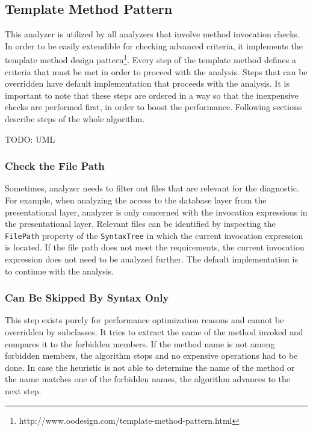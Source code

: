 \documentclass[
  digital, %
  table,   %
  lof,     %
  lot,     %
  oneside,
]{fithesis3}
\begin{document}
\subsection{Template Method Pattern}
This analyzer is utilized by all analyzers that involve method invocation checks. In order to be easily extendible for checking advanced criteria, it implements the template method design pattern\footnote{http://www.oodesign.com/template-method-pattern.html}. Every step of the template method defines a criteria that must be met in order to proceed with the analysis. Steps that can be overridden have default implementation that proceeds with the analysis. It is important to note that these steps are ordered in a way so that the inexpensive checks are performed first, in order to boost the performance. Following sections describe steps of the whole algorithm.

TODO: UML 

\subsubsection{Check the File Path}
Sometimes, analyzer needs to filter out files that are relevant for the diagnostic. For example, when analyzing the access to the database layer from the presentational layer, analyzer is only concerned with the invocation expressions in the presentational layer. Relevant files can be identified by inspecting the \texttt{FilePath} property of the \texttt{SyntaxTree} in which the current invocation expression is located. If the file path does not meet the requirements, the current invocation expression does not need to be analyzed further. The default implementation is to continue with the analysis.

\subsubsection{Can Be Skipped By Syntax Only}
This step exists purely for performance optimization reasons and cannot be overridden by subclasses. It tries to extract the name of the method invoked and compares it to the forbidden members. If the method name is not among forbidden members, the algorithm stops and no expensive operations had to be done. In case the heuristic is not able to determine the name of the method or the name matches one of the forbidden names, the algorithm advances to the next step.
\end{document}
